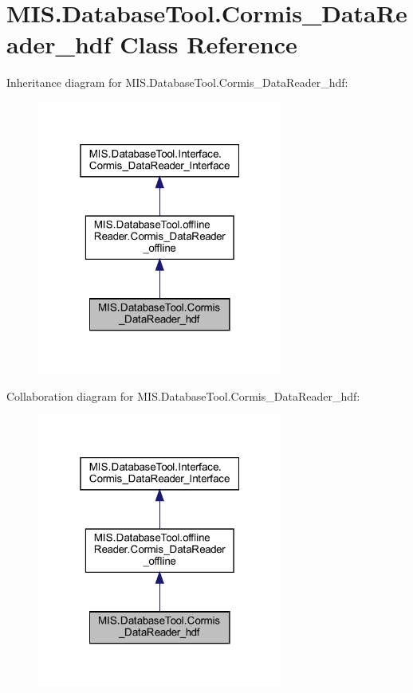 \hypertarget{classMIS_1_1DatabaseTool_1_1Cormis__DataReader__hdf}{}\section{M\+I\+S.\+Database\+Tool.\+Cormis\+\_\+\+Data\+Reader\+\_\+hdf Class Reference}
\label{classMIS_1_1DatabaseTool_1_1Cormis__DataReader__hdf}


Inheritance diagram for M\+I\+S.\+Database\+Tool.\+Cormis\+\_\+\+Data\+Reader\+\_\+hdf\+:\nopagebreak
\begin{figure}[H]
\begin{center}
\leavevmode
\includegraphics[width=229pt]{classMIS_1_1DatabaseTool_1_1Cormis__DataReader__hdf__inherit__graph}
\end{center}
\end{figure}


Collaboration diagram for M\+I\+S.\+Database\+Tool.\+Cormis\+\_\+\+Data\+Reader\+\_\+hdf\+:\nopagebreak
\begin{figure}[H]
\begin{center}
\leavevmode
\includegraphics[width=229pt]{classMIS_1_1DatabaseTool_1_1Cormis__DataReader__hdf__coll__graph}
\end{center}
\end{figure}
